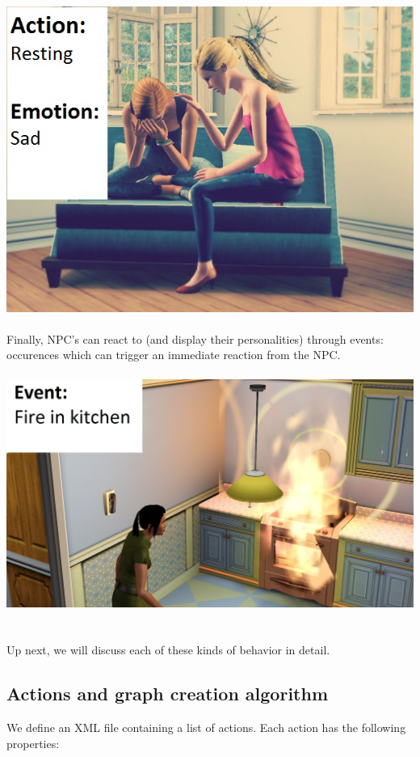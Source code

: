 \documentclass[11pt]{article} %
\begin{document}
~\\
\includegraphics[scale=0.4]{SimsCrying}
~\\

Finally, NPC's can react to (and display their personalities) through events: occurences which can trigger an immediate reaction from the NPC.
~\\

~\\
\includegraphics[scale=0.4]{SimsFire}
~\\

~\\
Up next, we will discuss each of these kinds of behavior in detail.

\newpage
\subsection{Actions and graph creation algorithm}
We define an XML file containing a list of actions. Each action has the following properties:
\end{document}
